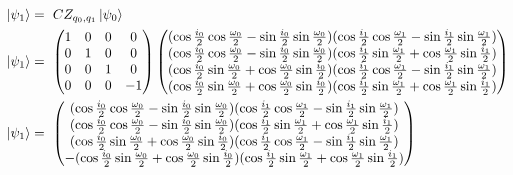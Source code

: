 \begin{equation}
    \centering
    \begin{split}
        \ket{\psi_1} &=\ CZ_{q_0,q_1}\ket{\psi_0} \\ 
        \ket{\psi_1} &=\ \begin{pmatrix}
        1 & 0 & 0 & 0 \\
        0 & 1 & 0 & 0 \\
        0 & 0 & 1 & 0 \\
        0 & 0 & 0 & -1
    \end{pmatrix}\begin{pmatrix}
     (\cos\frac{i_{0}}{2}\cos\frac{\omega_{0}}{2} - \sin\frac{i_{0}}{2}\sin\frac{\omega_{0}}{2})(\cos\frac{i_{1}}{2}\cos\frac{\omega_{1}}{2} - \sin\frac{i_{1}}{2}\sin\frac{\omega_{1}}{2})\\
     (\cos\frac{i_{0}}{2}\cos\frac{\omega_{0}}{2} - \sin\frac{i_{0}}{2}\sin\frac{\omega_{0}}{2})(\cos\frac{i_{1}}{2}\sin\frac{\omega_{1}}{2} + \cos\frac{\omega_{1}}{2}\sin\frac{i_{1}}{2})\\
     (\cos\frac{i_{0}}{2}\sin\frac{\omega_{0}}{2} + \cos\frac{\omega_{0}}{2}\sin\frac{i_{0}}{2})(\cos\frac{i_{1}}{2}\cos\frac{\omega_{1}}{2} - \sin\frac{i_{1}}{2}\sin\frac{\omega_{1}}{2})\\
     (\cos\frac{i_{0}}{2}\sin\frac{\omega_{0}}{2} + \cos\frac{\omega_{0}}{2}\sin\frac{i_{0}}{2})(\cos\frac{i_{1}}{2}\sin\frac{\omega_{1}}{2} + \cos\frac{\omega_{1}}{2}\sin\frac{i_{1}}{2})\\
    \end{pmatrix} \\
    \ket{\psi_1} &=\ \begin{pmatrix}
     (\cos\frac{i_{0}}{2}\cos\frac{\omega_{0}}{2} - \sin\frac{i_{0}}{2}\sin\frac{\omega_{0}}{2})(\cos\frac{i_{1}}{2}\cos\frac{\omega_{1}}{2} - \sin\frac{i_{1}}{2}\sin\frac{\omega_{1}}{2})\\
     (\cos\frac{i_{0}}{2}\cos\frac{\omega_{0}}{2} - \sin\frac{i_{0}}{2}\sin\frac{\omega_{0}}{2})(\cos\frac{i_{1}}{2}\sin\frac{\omega_{1}}{2} + \cos\frac{\omega_{1}}{2}\sin\frac{i_{1}}{2})\\
     (\cos\frac{i_{0}}{2}\sin\frac{\omega_{0}}{2} + \cos\frac{\omega_{0}}{2}\sin\frac{i_{0}}{2})(\cos\frac{i_{1}}{2}\cos\frac{\omega_{1}}{2} - \sin\frac{i_{1}}{2}\sin\frac{\omega_{1}}{2})\\
     -(\cos\frac{i_{0}}{2}\sin\frac{\omega_{0}}{2} + \cos\frac{\omega_{0}}{2}\sin\frac{i_{0}}{2})(\cos\frac{i_{1}}{2}\sin\frac{\omega_{1}}{2} + \cos\frac{\omega_{1}}{2}\sin\frac{i_{1}}{2})\\
     \end{pmatrix}
    \end{split}
    \label{equation:entanglement_calculation}
\end{equation}


